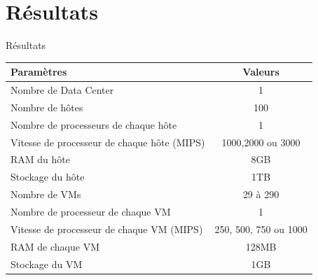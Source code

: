 \documentclass[xcolor=dvipsnames]{beamer}
\begin{document}
\section{Résultats}
\begin{frame}
\begin{block}{}
\begin{center}

\Huge Résultats
\end{center}
\end{block}

\begin{center}

\begin{center}
{\footnotesize   \begin{tabular}{|p{6cm}|c|}
\hline
      \centering     Paramètres &  Valeurs\\
\hline
     \centering       Nombre de Data Center &  1\\
\hline
      \centering      Nombre de hôtes &  100\\
\hline
      \centering      Nombre de processeurs de chaque hôte &  1\\
\hline
      \centering      Vitesse de processeur de chaque hôte (MIPS)&  1000,2000 ou 3000\\
\hline

      \centering    RAM du hôte &  8GB\\
\hline
      \centering    Stockage du hôte &  1TB\\
\hline
      \centering      Nombre de VMs &  29 à 290\\
\hline
      \centering      Nombre de processeur de chaque VM &  1\\
\hline
      \centering    Vitesse de processeur de chaque VM (MIPS) &  250, 500, 750 ou 1000\\
\hline

      \centering    RAM de chaque VM &  128MB\\
\hline
     \centering    Stockage du VM &  1GB\\
\hline

\end{tabular}}
\end{center}

\end{center}
\end{frame}
\end{document}
